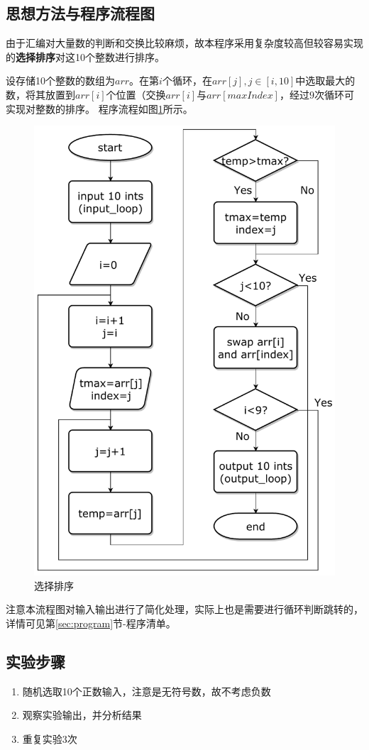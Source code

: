\documentclass[12pt,UTF8]{ctexart}
\begin{document}
\begin{spacing}{1.1}
\subsection{思想方法与程序流程图}
\par 由于汇编对大量数的判断和交换比较麻烦，故本程序采用复杂度较高但较容易实现的\textbf{选择排序}对这10个整数进行排序。
\par 设存储10个整数的数组为$arr$。在第$i$个循环，在$arr[j],j\in[i,10]$中选取最大的数，将其放置到$arr[i]$个位置（交换$arr[i]$与$arr[maxIndex]$，经过$9$次循环可实现对整数的排序。
程序流程如图\ref{fig:sorting}所示。
\begin{figure}[htbp]
	\centering
	\includegraphics[width=0.6\linewidth]{fig/selection_sort.pdf}
	\caption{选择排序}
	\label{fig:sorting}
\end{figure}
\par 注意本流程图对输入输出进行了简化处理，实际上也是需要进行循环判断跳转的，详情可见第\ref{sec:program}节-程序清单。

\subsection{实验步骤}
\begin{enumerate}
	\item 随机选取10个正数输入，注意是无符号数，故不考虑负数
	\item 观察实验输出，并分析结果
	\item 重复实验3次
\end{enumerate}


\end{spacing}
\end{document}
